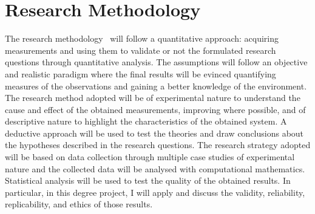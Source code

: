 
\section{Research Methodology}

\noindent
The research methodology~\cite{RESEARCHMETHOD} will follow a quantitative approach: acquiring measurements and using them to validate or not the formulated research questions through quantitative analysis.
The assumptions will follow an objective and realistic paradigm where the final results will be evinced quantifying measures of the observations and gaining a better knowledge of the environment.
The research method adopted will be of experimental nature to understand the cause and effect of the obtained measurements, improving where possible, and of descriptive nature to highlight the characteristics of the obtained system.
A deductive approach will be used to test the theories and draw conclusions about the hypotheses described in the research questions.
The research strategy adopted will be based on data collection through multiple case studies of experimental nature and the collected data will be analysed with computational mathematics.
Statistical analysis will be used to test the quality of the obtained results.
In particular, in this degree project, I will apply and discuss the validity, reliability, replicability, and ethics of those results.

